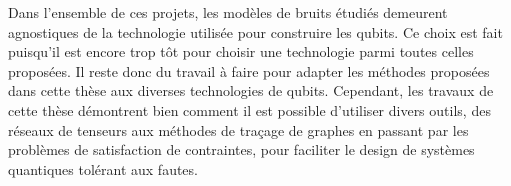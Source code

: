 Dans l'ensemble de ces projets,
les modèles de bruits étudiés demeurent agnostiques de la technologie utilisée pour construire
les qubits.
Ce choix est fait puisqu'il est encore trop tôt pour choisir une technologie parmi toutes celles
proposées.
Il reste donc du travail à faire pour adapter les méthodes proposées dans cette thèse aux diverses 
technologies de qubits.
Cependant,
les travaux de cette thèse démontrent bien comment il est possible d'utiliser divers outils,
des réseaux de tenseurs aux méthodes de traçage de graphes en passant par les problèmes de satisfaction
de contraintes,
pour faciliter le design de systèmes quantiques tolérant aux fautes.

